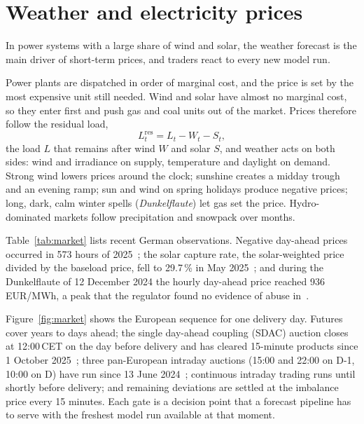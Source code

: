 \section{Weather and electricity prices}
\label{sec:markets}

In power systems with a large share of wind and solar, the weather forecast is the main driver of short-term prices, and traders react to every new model run.

 Power plants are dispatched in order of marginal cost, and the price is set by the most expensive unit still needed. Wind and solar have almost no marginal cost, so they enter first and push gas and coal units out of the market. Prices therefore follow the residual load,
\begin{equation}
L^{\text{res}}_t=L_t-W_t-S_t ,
\end{equation}
the load $L$ that remains after wind $W$ and solar $S$, and weather acts on both sides: wind and irradiance on supply, temperature and daylight on demand. Strong wind lowers prices around the clock; sunshine creates a midday trough and an evening ramp; sun and wind on spring holidays produce negative prices; long, dark, calm winter spells (\emph{Dunkelflaute}) let gas set the price. Hydro-dominated markets follow precipitation and snowpack over months.

 Table~\ref{tab:market} lists recent German observations. Negative day-ahead prices occurred in 573 hours of 2025~\cite{smard2026solar,bloomberg2026negative}; the solar capture rate, the solar-weighted price divided by the baseload price, fell to 29.7\,\% in May 2025~\cite{spglobal2025capture}; and during the Dunkelflaute of 12 December 2024 the hourly day-ahead price reached 936\,EUR/MWh, a peak that the regulator found no evidence of abuse in~\cite{smard2025peaks}.



 Figure~\ref{fig:market} shows the European sequence for one delivery day. Futures cover years to days ahead; the single day-ahead coupling (SDAC) auction closes at 12:00\,CET on the day before delivery and has cleared 15-minute products since 1 October 2025~\cite{apg2025mtu}; three pan-European intraday auctions (15:00 and 22:00 on D-1, 10:00 on D) have run since 13 June 2024~\cite{nordpool2024ida}; continuous intraday trading runs until shortly before delivery; and remaining deviations are settled at the imbalance price every 15 minutes. Each gate is a decision point that a forecast pipeline has to serve with the freshest model run available at that moment.

